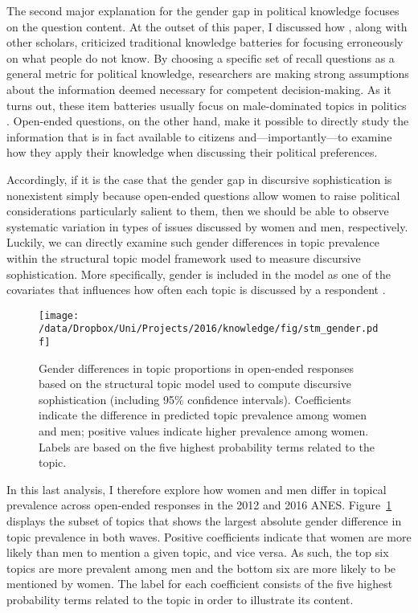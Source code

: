 The second major explanation for the gender gap in political knowledge focuses on the question content. At the outset of this paper, I discussed how \citet{cramer2017fact}, along with other scholars, criticized traditional knowledge batteries for focusing erroneously on what people do not know. By choosing a specific set of recall questions as a general metric for political knowledge, researchers are making strong assumptions about the information deemed necessary for competent decision-making. As it turns out, these item batteries usually focus on male-dominated topics in politics \citep{dolan2011women}. Open-ended questions, on the other hand, make it possible to directly study the information that is in fact available to citizens and---importantly---to examine how they apply their knowledge when discussing their political preferences.

Accordingly, if it is the case that the gender gap in discursive sophistication is nonexistent simply because open-ended questions allow women to raise political considerations particularly salient to them, then we should be able to observe systematic variation in types of issues discussed by women and men, respectively. Luckily, we can directly examine such gender differences in topic prevalence within the structural topic model framework used to measure discursive sophistication. More specifically, gender is included in the model as one of the covariates that influences how often each topic is discussed by a respondent \citep[see also][for details]{roberts2014structural}.

\begin{figure}[h]\centering
\texttt{[image: /data/Dropbox/Uni/Projects/2016/knowledge/fig/stm\_gender.pdf]}
\caption[Gender differences in topic proprtions in open-ended responses]{Gender differences in topic proportions in open-ended responses based on the structural topic model used to compute discursive sophistication (including 95\% confidence intervals). Coefficients indicate the difference in predicted topic prevalence among women and men; positive values indicate higher prevalence among women. Labels are based on the five highest probability terms related to the topic.
}\label{fig:stm_gender}
\end{figure}

In this last analysis, I therefore explore how women and men differ in topical prevalence across open-ended responses in the 2012 and 2016 ANES. Figure~\ref{fig:stm_gender} displays the subset of topics that shows the largest absolute gender difference in topic prevalence in both waves. Positive coefficients indicate that women are more likely than men to mention a given topic, and vice versa. As such, the top six topics are more prevalent among men and the bottom six are more likely to be mentioned by women. The label for each coefficient consists of the five highest probability terms related to the topic in order to illustrate its content.

